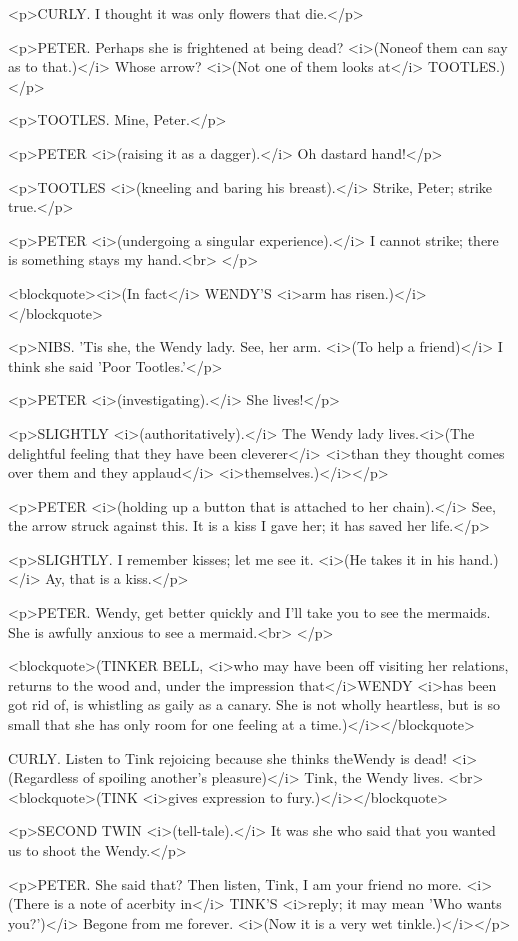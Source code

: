 <p>CURLY. I thought it was only flowers that die.</p>

<p>PETER. Perhaps she is frightened at being dead? <i>(Noneof them
can say as to that.)</i> Whose arrow? <i>(Not one of them looks
at</i> TOOTLES.)</p>

<p>TOOTLES. Mine, Peter.</p>

<p>PETER <i>(raising it as a dagger).</i> Oh dastard hand!</p>

<p>TOOTLES <i>(kneeling and baring his breast).</i> Strike, Peter;
strike true.</p>

<p>PETER <i>(undergoing a singular experience).</i> I cannot strike;
there is something stays my hand.<br>
</p>

<blockquote><i>(In fact</i> WENDY'S <i>arm has
risen.)</i></blockquote>

<p>NIBS. 'Tis she, the Wendy lady. See, her arm. <i>(To help a
friend)</i> I think she said 'Poor Tootles.'</p>

<p>PETER <i>(investigating).</i> She lives!</p>

<p>SLIGHTLY <i>(authoritatively).</i> The Wendy lady lives.<i>(The
delightful feeling that they have been cleverer</i> <i>than they
thought comes over them and they applaud</i> <i>themselves.)</i></p>

<p>PETER <i>(holding up a button that is attached to her chain).</i>
See, the arrow struck against this. It is a kiss I gave her; it has
saved her life.</p>

<p>SLIGHTLY. I remember kisses; let me see it. <i>(He takes it in his
hand.)</i> Ay, that is a kiss.</p>

<p>PETER. Wendy, get better quickly and I'll take you to see the
mermaids. She is awfully anxious to see a mermaid.<br>
</p>

<blockquote>(TINKER BELL, <i>who may have been off visiting her
relations, returns to the wood and, under the impression
that</i>WENDY <i>has been got rid of, is whistling as gaily as a
canary. She is not wholly heartless, but is so small that she has
only room for one feeling at a time.)</i></blockquote>

CURLY. Listen to Tink rejoicing because she thinks theWendy is dead!
<i>(Regardless of spoiling another's pleasure)</i> Tink, the Wendy
lives. <br>
<blockquote>(TINK <i>gives expression to fury.)</i></blockquote>

<p>SECOND TWIN <i>(tell-tale).</i> It was she who said that you
wanted us to shoot the Wendy.</p>

<p>PETER. She said that? Then listen, Tink, I am your friend no more.
<i>(There is a note of acerbity in</i> TINK'S <i>reply; it may mean
'Who wants you?')</i> Begone from me forever. <i>(Now it is a very
wet tinkle.)</i></p>

